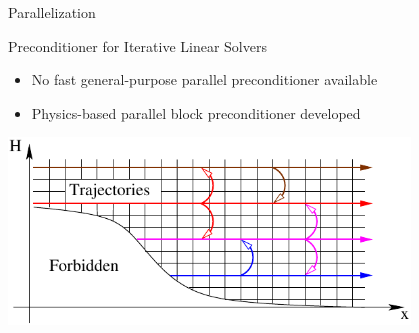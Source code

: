 \documentclass[usepdftitle=false,10pt]{beamer}
\begin{document}
\begin{frame}{Parallelization}
 \begin{block}{Preconditioner for Iterative Linear Solvers}
  \begin{itemize}
   \item No fast general-purpose parallel preconditioner available
   \item Physics-based parallel block preconditioner developed
  \end{itemize}
  \begin{center}
   \includegraphics[width=0.8\textwidth]{electron-trajectory-2}
  \end{center}
 \end{block}

\end{frame}
\end{document}
